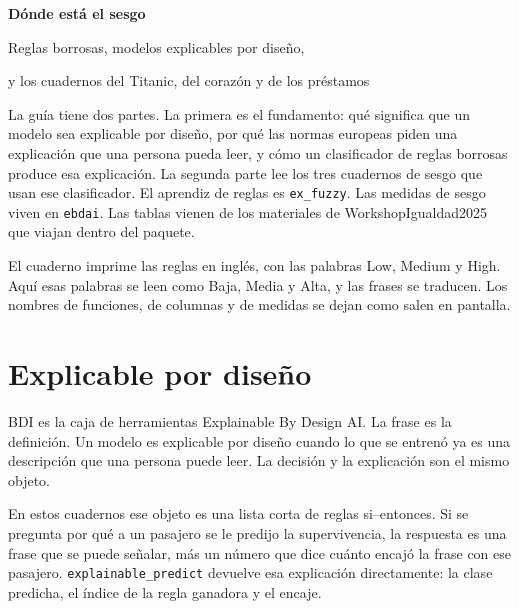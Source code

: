 \documentclass[11pt]{article}
\newcommand{\fn}[1]{\texttt{\small #1}}
\begin{document}
\color{ebdink}
\raggedbottom
\thispagestyle{fancy}

\begin{tcolorbox}[
  colback=ebdink, colframe=ebdink, arc=3pt,
  left=12pt, right=12pt, top=9pt, bottom=9pt,
  before skip=0pt, after skip=8pt,
]
{\color{white}\sffamily\bfseries\fontsize{21}{25}\selectfont Dónde está el sesgo\par}
\vspace{3pt}
{\color{white!88}\sffamily Reglas borrosas, modelos explicables por diseño,\par y los cuadernos del Titanic, del corazón y de los préstamos\par}
\end{tcolorbox}

\noindent
La guía tiene dos partes. La primera es el fundamento: qué significa que un modelo sea explicable por diseño, por qué las normas europeas piden una explicación que una persona pueda leer, y cómo un clasificador de reglas borrosas produce esa explicación. La segunda parte lee los tres cuadernos de sesgo que usan ese clasificador. El aprendiz de reglas es \fn{ex\_fuzzy}. Las medidas de sesgo viven en \fn{ebdai}. Las tablas vienen de los materiales de WorkshopIgualdad2025 que viajan dentro del paquete.

El cuaderno imprime las reglas en inglés, con las palabras Low, Medium y High. Aquí esas palabras se leen como Baja, Media y Alta, y las frases se traducen. Los nombres de funciones, de columnas y de medidas se dejan como salen en pantalla.

\section{Explicable por diseño}
\label{sec:ebd}

BDI es la caja de herramientas Explainable By Design AI. La frase es la definición. Un modelo es explicable por diseño cuando lo que se entrenó ya es una descripción que una persona puede leer. La decisión y la explicación son el mismo objeto.

En estos cuadernos ese objeto es una lista corta de reglas si--entonces. Si se pregunta por qué a un pasajero se le predijo la supervivencia, la respuesta es una frase que se puede señalar, más un número que dice cuánto encajó la frase con ese pasajero. \fn{explainable\_predict} devuelve esa explicación directamente: la clase predicha, el índice de la regla ganadora y el encaje.
\end{document}
